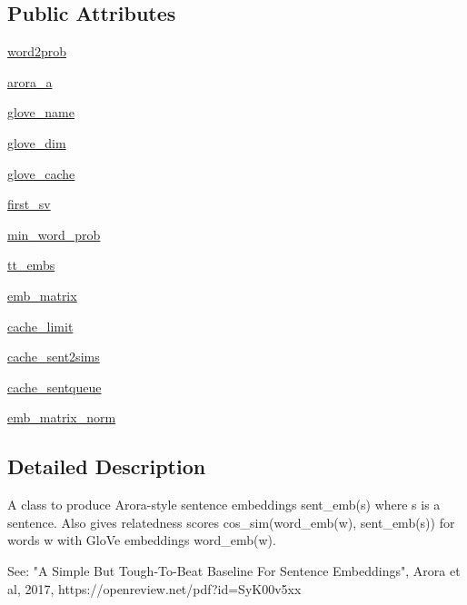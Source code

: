 \subsection*{Public Attributes}
\begin{DoxyCompactItemize}
\item 
\hyperlink{classcontrollable__seq2seq_1_1arora_1_1SentenceEmbedder_a3a0e8a0333cc523bc57aa8f2f6187a5c}{word2prob}
\item 
\hyperlink{classcontrollable__seq2seq_1_1arora_1_1SentenceEmbedder_a14187c96a59bc562fa4749498608eed1}{arora\+\_\+a}
\item 
\hyperlink{classcontrollable__seq2seq_1_1arora_1_1SentenceEmbedder_a2053bb8bcd6b2ebb12fa164232ba2402}{glove\+\_\+name}
\item 
\hyperlink{classcontrollable__seq2seq_1_1arora_1_1SentenceEmbedder_a5c9e975f252f1bd70fd77944e4ffbbe0}{glove\+\_\+dim}
\item 
\hyperlink{classcontrollable__seq2seq_1_1arora_1_1SentenceEmbedder_a7cd48cd4b59e86541c4fa7fdfd4673e4}{glove\+\_\+cache}
\item 
\hyperlink{classcontrollable__seq2seq_1_1arora_1_1SentenceEmbedder_ab1517d287364c3ecc36ae4b55e272b06}{first\+\_\+sv}
\item 
\hyperlink{classcontrollable__seq2seq_1_1arora_1_1SentenceEmbedder_a83888db228adcc79f5724ed5b6985306}{min\+\_\+word\+\_\+prob}
\item 
\hyperlink{classcontrollable__seq2seq_1_1arora_1_1SentenceEmbedder_a3abeb62adc1f7726978b17b6068cc65c}{tt\+\_\+embs}
\item 
\hyperlink{classcontrollable__seq2seq_1_1arora_1_1SentenceEmbedder_a02e932d533421306cf0d9489d2db3bef}{emb\+\_\+matrix}
\item 
\hyperlink{classcontrollable__seq2seq_1_1arora_1_1SentenceEmbedder_a257a83a82b1fe9287d7a416bf1d7855d}{cache\+\_\+limit}
\item 
\hyperlink{classcontrollable__seq2seq_1_1arora_1_1SentenceEmbedder_a3026a0a5704837bba47719a4d0b82533}{cache\+\_\+sent2sims}
\item 
\hyperlink{classcontrollable__seq2seq_1_1arora_1_1SentenceEmbedder_acb4c6f74644b50b274720aeff4efab71}{cache\+\_\+sentqueue}
\item 
\hyperlink{classcontrollable__seq2seq_1_1arora_1_1SentenceEmbedder_a039e15ff34372d5eed5ef0aa587e7272}{emb\+\_\+matrix\+\_\+norm}
\end{DoxyCompactItemize}


\subsection{Detailed Description}
\begin{DoxyVerb}A class to produce Arora-style sentence embeddings
  sent_emb(s)
where s is a sentence. Also gives relatedness scores
  cos_sim(word_emb(w), sent_emb(s))
for words w with GloVe embeddings word_emb(w).

See: "A Simple But Tough-To-Beat Baseline For Sentence Embeddings",
Arora et al, 2017, https://openreview.net/pdf?id=SyK00v5xx
\end{DoxyVerb}
 


